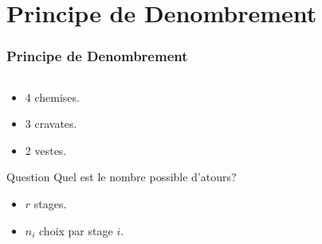 \documentclass{beamer}
\begin{document}
\section{Principe de Denombrement}
\begin{frame}[t]
  \frametitle{Principe de Denombrement}
  \begin{columns}
    \begin{column}{0.5\textwidth}
     \begin{itemize}
       \item<1->   4 chemises.
       \item<1->   3 cravates.
        \item<1->  2 vestes.
     \end{itemize} 

     \begin{block}{Question}
       \scriptsize
       Quel est le nombre possible d'atours?
     \end{block}
     \begin{itemize}
       \item<2-> $r$ stages.
       \item<3-> $n_i$ choix par stage $i$.
     \end{itemize}
    \end{column}
    \begin{column}{0.5\textwidth}
    \end{column}
  \end{columns}
\end{frame}
\end{document}
